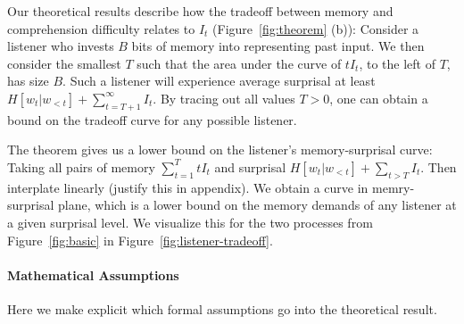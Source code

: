 Our theoretical results describe how the tradeoff between memory and comprehension difficulty relates to $I_t$ (Figure~\ref{fig:theorem} (b)):
Consider a listener who invests $B$ bits of memory into representing past input.
We then consider the smallest $T$ such that the area under the curve of $t I_t$, to the left of $T$, has size $B$.
Such a listener will experience average surprisal at least $H[w_t| w_{<t}] + \sum_{t=T+1}^\infty I_t$. %
By tracing out all values $T >0$, one can obtain a bound on the tradeoff curve for any possible listener.








The theorem gives us a lower bound on the listener's memory-surprisal curve: Taking all pairs of memory $\sum_{t=1}^T t I_t$ and surprisal $H[w_t|w_{<t}] + \sum_{t > T} I_t$.
Then interplate linearly (justify this in appendix).
We obtain a curve in memry-surprisal plane, which is a lower bound on the memory demands of any listener at a given surprisal level.
We visualize this for the two processes from Figure~\ref{fig:basic} in Figure~\ref{fig:listener-tradeoff}.



\paragraph{Mathematical Assumptions}
Here we make explicit which formal assumptions go into the theoretical result.

